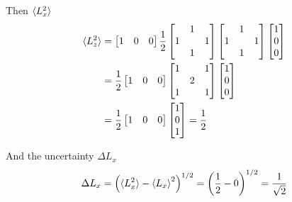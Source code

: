 \documentclass[../../../main.tex]{subfiles}
\begin{document}
Then $\braket{L_x^2}$
\begin{align*}
    \braket{L_z^2}&= 
    \begin{bmatrix}
        1&0&0
    \end{bmatrix}
    \frac{1 }{2}
    \begin{bmatrix}
        &1&\\
        1&&1\\
        &1&\\
    \end{bmatrix}
    \begin{bmatrix}
        &1&\\
        1&&1\\
        &1&\\
    \end{bmatrix}
    \begin{bmatrix}
        1\\
        0\\
        0\\
    \end{bmatrix}\\
    &= 
    \frac{1 }{2}
    \begin{bmatrix}
        1&0&0
    \end{bmatrix}
    \begin{bmatrix}
        1&&1\\
        &2&\\
        1&&1\\
    \end{bmatrix}
    \begin{bmatrix}
        1\\
        0\\
        0\\
    \end{bmatrix}\\
    &= 
   \frac{1 }{2}
    \begin{bmatrix}
        1&0&0
    \end{bmatrix}
    \begin{bmatrix}
        1\\
        0\\
        1\\
    \end{bmatrix}
    =
    \frac{1 }{2 }
\end{align*}

And the uncertainty $\Delta L_x$
\begin{equation*}
    \Delta L_x =  \left( \braket{L_x^2}-\braket{L_x}^2 \right) ^{1/2 }=\left( \frac{1 }{2 } -0\right) ^{1/2 }=\frac{1 }{\sqrt{2 }}
\end{equation*}
\end{document}
